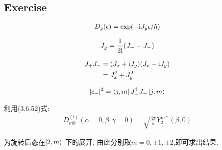 \subsection{Exercise}

\begin{exercise}[3.13]
  \begin{equation}
    \begin{aligned}
      D_{y}(\epsilon) = \exp(- {\rm i} J_{y} \epsilon / \hbar)
    \end{aligned}
  \end{equation}

  \begin{equation}
    \begin{aligned}
      J_{y} = \frac{1}{2 {\rm i}} (J_{+} - J_{-})
    \end{aligned}
  \end{equation}

\end{exercise}

\begin{exercise}[3.15]
  \begin{equation}
    \begin{aligned}
      J_{+}J_{-} & = (J_{x} + {\rm i} J_{y})(J_{x} - {\rm i} J_{y})\\
                 & = J_{x}^{2} + J_{y}^{2}
    \end{aligned}
  \end{equation}

  \begin{equation}
    \begin{aligned}
      |c_{-}|^{2} = \bra{j,m}J_{-}^{\dagger} J_{-} \ket{j,m}
    \end{aligned}
  \end{equation}
\end{exercise}

\begin{exercise}[3.20]
  利用(3.6.52)式:
  \begin{equation}
    \begin{aligned}
      D^{(l)}_{m 0}(\alpha=0,\beta,\gamma=0) = \sqrt{\frac{4 \pi}{5}}Y^{m*}_{2}(\beta,0)
    \end{aligned}
  \end{equation}
  
  为旋转后态在$\ket{2,m}$ 下的展开, 由此分别取$m=0,\pm 1,\pm 2$,即可求出结果.

\end{exercise}

